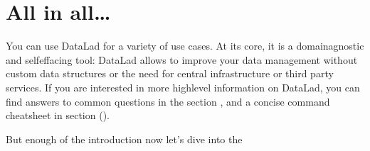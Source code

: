 \section{All in all…}
\label{\detokenize{intro/executive_summary:all-in-all}}
\sphinxAtStartPar
You can use DataLad for a variety of use cases. At its core, it is a domain\sphinxhyphen{}agnostic
and self\sphinxhyphen{}effacing tool: DataLad allows to improve your data management without
custom data structures or the need for central infrastructure or third party
services.
If you are interested in more high\sphinxhyphen{}level information on DataLad, you can find
answers to common questions in the section , and a concise command
cheat\sphinxhyphen{}sheet in section {\hyperref[\detokenize{basics/101-136-cheatsheet:cheat}]{}} ().

\sphinxAtStartPar
But enough of the introduction now \textendash{} let’s dive into the

\sphinxstepscope


